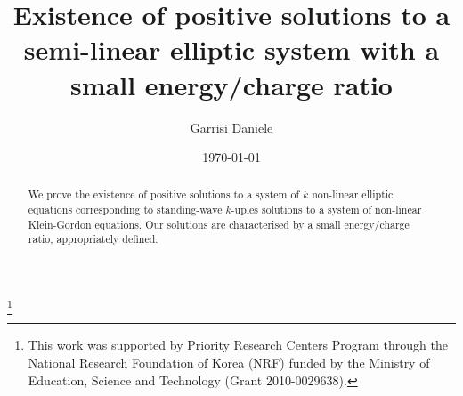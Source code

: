 \documentclass[a4paper,12pt,oneside]{amsart}
\theoremstyle{definition}
\theoremstyle{remark}
\theoremstyle{theorem}
\begin{document}
\title[Solutions with a small energy/charge ratio]{Existence of positive solutions to a semi-linear elliptic 
system with a small energy/charge ratio}
\author{Garrisi Daniele}
\address{Math Sci. Bldg Room \# 302, POSTECH, Hyoja-Dong, Nam-Gu, Pohang, 
Gyeongbuk, 790-784, Republic of Korea}
\curraddr{}
\thanks{This work was supported by Priority 
Research Centers Program through the National Research Foundation of Korea 
(NRF) funded by the Ministry of Education, Science and Technology 
(Grant 2010-0029638).}
\date{\today}
\begin{abstract}
We prove the existence of positive solutions to a system of $ {k} $ 
non-linear elliptic equations corresponding to standing-wave $ k $-uples
solutions to a system of non-linear Klein-Gordon equations. 
Our solutions are characterised by a small energy/charge ratio,
appropriately defined.
\end{abstract}
\maketitle
\end{document}
